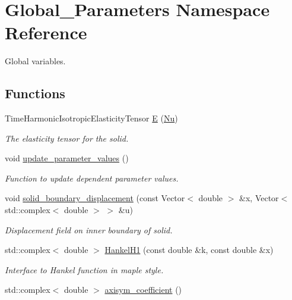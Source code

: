 \hypertarget{namespaceGlobal__Parameters}{}\section{Global\+\_\+\+Parameters Namespace Reference}
\label{namespaceGlobal__Parameters}


Global variables.  


\subsection*{Functions}
\begin{DoxyCompactItemize}
\item 
Time\+Harmonic\+Isotropic\+Elasticity\+Tensor \hyperlink{namespaceGlobal__Parameters_aeeb26e11ef275bdfce14710e00290bb6}{E} (\hyperlink{namespaceGlobal__Parameters_a20fccdcfa2c15ad8b951b9ada3bb1661}{Nu})
\begin{DoxyCompactList}\small\item\em The elasticity tensor for the solid. \end{DoxyCompactList}\item 
void \hyperlink{namespaceGlobal__Parameters_ae0f9a80fb7510dbfbbef22582da231b7}{update\+\_\+parameter\+\_\+values} ()
\begin{DoxyCompactList}\small\item\em Function to update dependent parameter values. \end{DoxyCompactList}\item 
void \hyperlink{namespaceGlobal__Parameters_ab51fa55d06d9963d363bcf966cfcc62b}{solid\+\_\+boundary\+\_\+displacement} (const Vector$<$ double $>$ \&x, Vector$<$ std\+::complex$<$ double $>$ $>$ \&u)
\begin{DoxyCompactList}\small\item\em Displacement field on inner boundary of solid. \end{DoxyCompactList}\item 
std\+::complex$<$ double $>$ \hyperlink{namespaceGlobal__Parameters_a116765fbd117ec6199c9399af801d510}{Hankel\+H1} (const double \&k, const double \&x)
\begin{DoxyCompactList}\small\item\em Interface to Hankel function in maple style. \end{DoxyCompactList}\item 
std\+::complex$<$ double $>$ \hyperlink{namespaceGlobal__Parameters_a12dd327bc592b36ffd4abbab5018146f}{axisym\+\_\+coefficient} ()

\end{DoxyCompactItemize}
